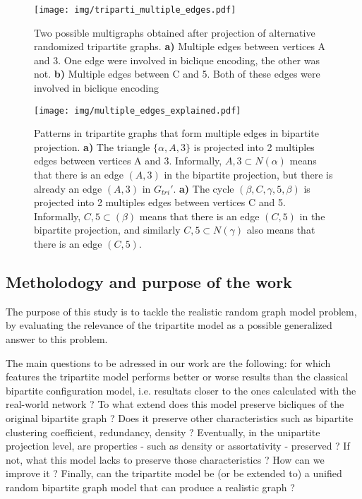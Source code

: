 \documentclass[table]{report}
\begin{document}

\begin{figure}[h]%
\centering
\texttt{[image: img/triparti\_multiple\_edges.pdf]}
\caption{Two possible multigraphs obtained after projection of alternative randomized tripartite graphs. \textbf{a)} Multiple edges between vertices A and 3. One edge were involved in biclique encoding, the other was not. \textbf{b)} Multiple edges between C and 5. Both of these edges were involved in biclique encoding}
\label{fig:graphs}
\end{figure}
\FloatBarrier

\begin{figure}[h]%
\centering
\texttt{[image: img/multiple\_edges\_explained.pdf]}
\caption{Patterns in tripartite graphs that form multiple edges in bipartite projection. 
\textbf{a)} The triangle $\{\alpha,A,3\}$ is projected into 2 multiples edges between vertices A and 3. Informally, ${A,3} \subset N(\alpha)$ means that there is an edge $(A,3)$ in the bipartite projection, but there is already an edge $(A,3)$ in ${G_{tri}}'$.
\textbf{a)} The cycle $(\beta,C,\gamma,5,\beta)$ is projected into 2 multiples edges between vertices C and 5. Informally, ${C,5} \subset (\beta)$ means that there is an edge $(C,5)$ in the bipartite projection, and similarly ${C,5} \subset N(\gamma)$ also means that there is an edge $(C,5)$.
}
\label{fig:graphs}
\end{figure}
\FloatBarrier


\subsection{Metholodogy and purpose of the work}

The purpose of this study is to tackle the realistic random graph model problem, by evaluating the relevance of the tripartite model as a possible generalized answer to this problem.

The main questions to be adressed in our work are the following: for which features the tripartite model performs better or worse results than the classical bipartite configuration model, i.e. resultats closer to the ones calculated with the real-world network ? To what extend does this model preserve bicliques of the original bipartite graph ? Does it preserve other characteristics such as bipartite clustering coefficient, redundancy, density ? Eventually, in the unipartite projection level, are properties  - such as density or assortativity - preserved ? If not, what this model lacks to preserve those characteristics ? How can we improve it ? Finally, can the tripartite model be (or be extended to) a unified random bipartite graph model that can produce a realistic graph ?
\end{document}
